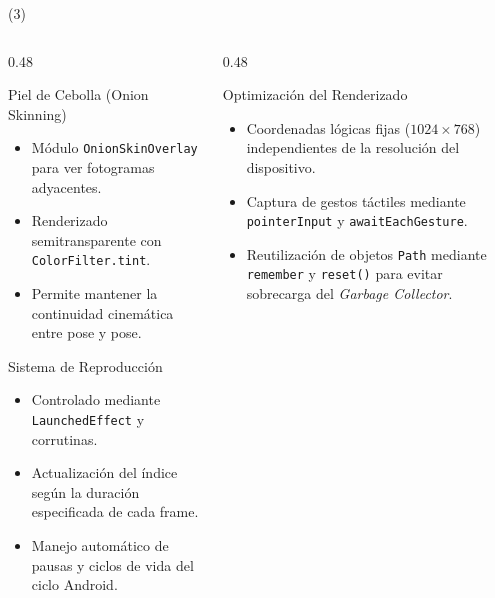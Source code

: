 \begin{frame}{\citetitle{\EntradaBibtex} (3)}
  \begin{columns}[T]
    \begin{column}{0.48\textwidth}
      \begin{block}{Piel de Cebolla (Onion Skinning)}
        \begin{itemize}
          \item Módulo \texttt{OnionSkinOverlay} para ver fotogramas adyacentes.
          \item Renderizado semitransparente con \texttt{ColorFilter.tint}.
          \item Permite mantener la continuidad cinemática entre pose y pose.
        \end{itemize}
      \end{block}

      \begin{block}{Sistema de Reproducción}
        \begin{itemize}
          \item Controlado mediante \texttt{LaunchedEffect} y corrutinas.
          \item Actualización del índice según la duración especificada de cada frame.
          \item Manejo automático de pausas y ciclos de vida del ciclo Android.
        \end{itemize}
      \end{block}
    \end{column}

    \begin{column}{0.48\textwidth}
      \begin{block}{Optimización del Renderizado}
        \begin{itemize}
          \item Coordenadas lógicas fijas ($1024 \times 768$) independientes de la resolución del dispositivo.
          \item Captura de gestos táctiles mediante \texttt{pointerInput} y \texttt{awaitEachGesture}.
          \item Reutilización de objetos \texttt{Path} mediante \texttt{remember} y \texttt{reset()} para evitar sobrecarga del \emph{Garbage Collector}.
        \end{itemize}
      \end{block}
    \end{column}
  \end{columns}
\end{frame}

